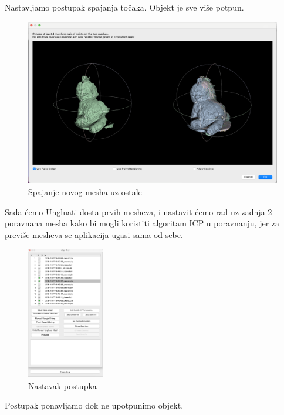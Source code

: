 \documentclass[12pt]{article} %
\begin{document}
		Nastavljamo postupak spajanja točaka. Objekt je sve više potpun.
		\begin{figure}[H]
			\centering
			\includegraphics[width=1\textwidth]{screenshots/9.png}
			\caption{Spajanje novog mesha uz ostale}
			\label{fig:yourlabel}
		\end{figure}
		
		Sada ćemo Ungluati dosta prvih mesheva, i nastavit ćemo rad uz zadnja 2 poravnana mesha kako bi mogli koristiti algoritam ICP u poravnanju, jer za previše mesheva se aplikacija ugasi sama od sebe.
		\begin{figure}[H]
			\centering
			\includegraphics[width=0.3\textwidth]{screenshots/10.png}
			\caption{Nastavak postupka}
			\label{fig:yourlabel}
		\end{figure}
		
		Postupak ponavljamo dok ne upotpunimo objekt.
		
\end{document}
